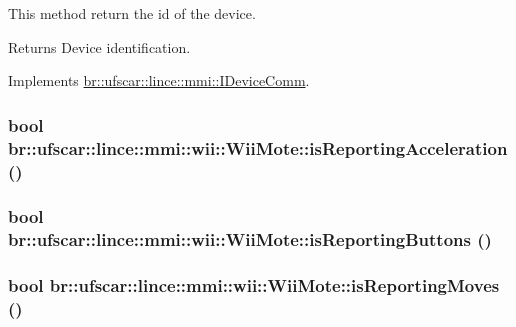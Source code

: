 This method return the id of the device. 

\begin{DoxyReturn}{Returns}
Device identification. 
\end{DoxyReturn}


Implements \hyperlink{classbr_1_1ufscar_1_1lince_1_1mmi_1_1IDeviceComm_a4ae69c19445713ddc9fda351555c1ac2}{br::ufscar::lince::mmi::IDeviceComm}.

\hypertarget{classbr_1_1ufscar_1_1lince_1_1mmi_1_1wii_1_1WiiMote_a969959e1b25dd2660e54d1e3acd520a4}{
\subsubsection[{isReportingAcceleration}]{\setlength{\rightskip}{0pt plus 5cm}bool br::ufscar::lince::mmi::wii::WiiMote::isReportingAcceleration ()}}
\label{classbr_1_1ufscar_1_1lince_1_1mmi_1_1wii_1_1WiiMote_a969959e1b25dd2660e54d1e3acd520a4}
\hypertarget{classbr_1_1ufscar_1_1lince_1_1mmi_1_1wii_1_1WiiMote_aa3b9e2935b6f0fc39b1a08260f3da66d}{
\subsubsection[{isReportingButtons}]{\setlength{\rightskip}{0pt plus 5cm}bool br::ufscar::lince::mmi::wii::WiiMote::isReportingButtons ()}}
\label{classbr_1_1ufscar_1_1lince_1_1mmi_1_1wii_1_1WiiMote_aa3b9e2935b6f0fc39b1a08260f3da66d}
\hypertarget{classbr_1_1ufscar_1_1lince_1_1mmi_1_1wii_1_1WiiMote_a1eeed1b89ee5cd55fedf9f8c75561ed0}{
\subsubsection[{isReportingMoves}]{\setlength{\rightskip}{0pt plus 5cm}bool br::ufscar::lince::mmi::wii::WiiMote::isReportingMoves ()}}
